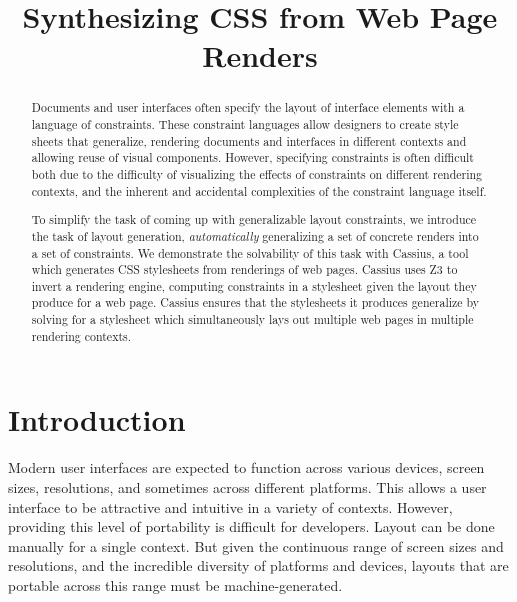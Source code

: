 \documentclass[10pt]{sigplanconf}
\newcommand{\name}{Cassius\xspace}
\begin{document}
\setlength{\pdfpageheight}{\paperheight}
\setlength{\pdfpagewidth}{\paperwidth}

\title{Synthesizing CSS from Web Page Renders}
\doi{}

\maketitle

\begin{abstract}
Documents and user interfaces
  often specify the layout of interface elements
  with a language of constraints.
These constraint languages allow designers
  to create style sheets that generalize,
  rendering documents and interfaces in different contexts
  and allowing reuse of visual components.
However, specifying constraints is often difficult
  both due to the difficulty of visualizing the effects of constraints
  on different rendering contexts,
  and the inherent and accidental complexities
  of the constraint language itself.

To simplify the task of coming up with generalizable layout constraints,
  we introduce the task of layout generation,
  \textit{automatically} generalizing a set of concrete renders
  into a set of constraints.
We demonstrate the solvability of this task with \name,
  a tool which generates CSS stylesheets from renderings of web pages.
\name uses Z3 to invert a rendering engine,
  computing constraints in a stylesheet
  given the layout they produce for a web page.
\name ensures that the stylesheets it produces generalize
  by solving for a stylesheet
  which simultaneously lays out multiple web pages
  in multiple rendering contexts.
\end{abstract}

\section{Introduction}

Modern user interfaces are expected to function
  across various devices, screen sizes, resolutions,
  and sometimes across different platforms.
This allows a user interface to be attractive and intuitive
  in a variety of contexts.
However, providing this level of portability
  is difficult for developers.
Layout can be done manually for a single context.
But given the continuous range of screen sizes and resolutions,
  and the incredible diversity of platforms and devices,
  layouts that are portable across this range
  must be machine-generated.
\end{document}
